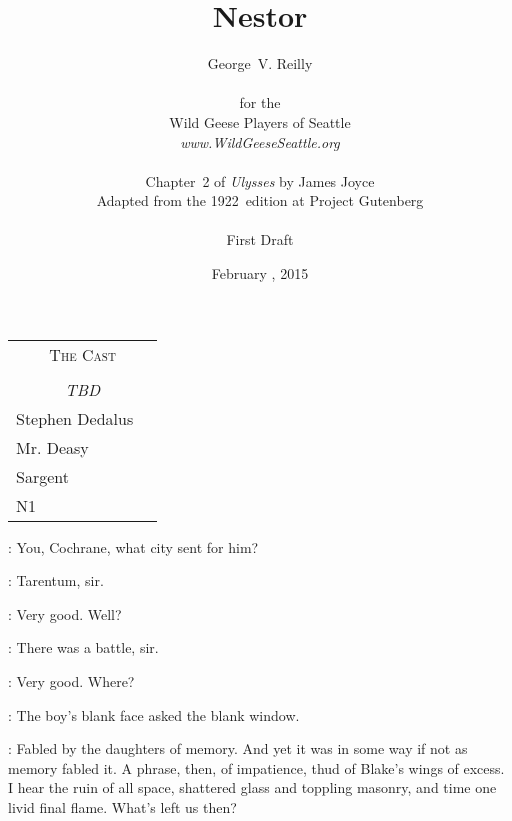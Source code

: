 



\title{\Huge Nestor}
\author{George~V. Reilly\\
\\
{\small for the}\\
Wild Geese Players of Seattle\\
{\emph{www.WildGeeseSeattle.org}}\\
\\
{\small Chapter~2 of \emph{Ulysses} by James Joyce}\\
{\small Adapted from the 1922~edition at Project Gutenberg}
\\
\\
{\small First Draft}}
\date{February , 2015}
\raggedbottom



\maketitle
\thispagestyle{empty}
\pagebreak

\begin{tabular}{lp{10cm}}
    \multicolumn{2}{c}{\Large \textsc{The Cast}} \\
\\
    \multicolumn{2}{c}{\large \textit{TBD}} \\
Stephen Dedalus \\
Mr. Deasy \\
Sargent \\
N1 \\
\end{tabular}

\thispagestyle{empty}
\newpage


\setcounter{page}{1}


\Stephen:
You, Cochrane, what city sent for him?

\cochrane:
Tarentum, sir.

\Stephen:
Very good. Well?

\cochrane:
There was a battle, sir.

\Stephen:
Very good.
Where?

:
The boy's blank face asked the blank window.

\StephenInt:
Fabled by the daughters of memory.
And yet it was in some way if not as memory fabled it.
A phrase, then, of impatience, thud of Blake's wings of excess.
I hear the ruin of all space, shattered glass and toppling masonry,
and time one livid final flame.
What's left us then?

